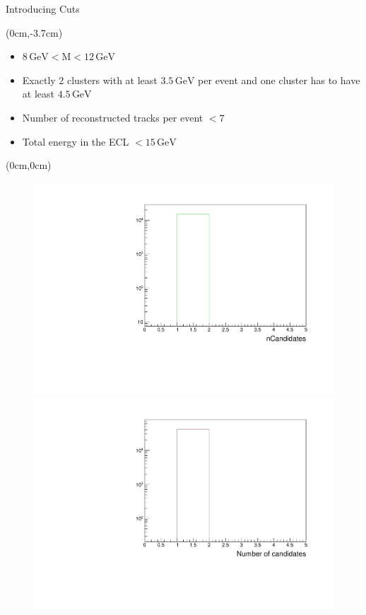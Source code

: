 \documentclass[8pt]{beamer}
\begin{document}
\begin{frame}{Introducing Cuts}
	\begin{textblock*}{11cm}(0cm,-3.7cm)
	\begin{itemize}
		\item $8\,\textrm{GeV} < \textrm{M} < 12\,\textrm{GeV}$
		\item Exactly 2 clusters with at least $3.5\,\textrm{GeV}$ per event and one cluster has to have at least $4.5\,\textrm{GeV}$
		\item Number of reconstructed tracks per event $< 7$
		\item Total energy in the ECL $< 15\,\textrm{GeV}$
	\end{itemize}

\end{textblock*}

\begin{textblock*}{11cm}(0cm,0cm)
\begin{figure}[h!]
	\centering
	\begin{minipage}[b]{0.45\linewidth}
		\centering
		\includegraphics[width=\textwidth]{VBilder/nCandNoMCInfo.pdf}
	\end{minipage}
	\hspace{0.5cm}
	\pause[2]
	\begin{minipage}[b]{0.45\linewidth}
		\centering
		\includegraphics[width=\textwidth]{VBilder/nCandData.pdf}
	\end{minipage}
	

\end{figure}
\end{textblock*}
\end{frame}
\end{document}
